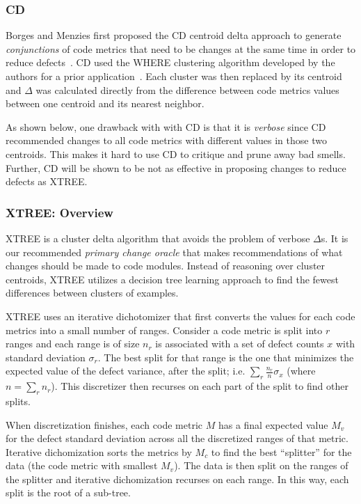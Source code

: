 \documentclass[twocolumn,5p]{elsarticle}
\theoremstyle{break}
\begin{document}
\subsubsection{CD}\label{sec:cdcd}
Borges and Menzies first proposed the CD centroid delta approach to
generate {\em conjunctions} of code metrics
that need to be changes at the same time
in order to reduce defects~\cite{me12c}.
CD used the WHERE clustering algorithm developed by the
authors for a prior application~\cite{localvsglobal}.
Each cluster was then replaced by its centroid
and $\Delta$ was calculated directly from the difference
between code metrics values between one centroid
and its nearest neighbor.


As shown below, one drawback with with CD is that it is {\em verbose}
since
CD   recommended changes to all code
metrics with different values in those two centroids. 
This makes it hard to use CD to   critique and prune away bad smells. Further, CD will be shown to be
not as effective
in proposing changes to reduce defects as XTREE.

\subsubsection{XTREE: Overview}

  XTREE  is a cluster delta algorithm
  that avoids the problem of verbose $\Delta$s.
  It is our recommended {\em primary change oracle} that makes recommendations 
  of what changes should be made to code modules.
  Instead of reasoning over cluster centroids,
  XTREE utilizes a decision tree learning approach
  to find the fewest differences between clusters of examples.
  
  
 XTREE uses an iterative dichotomizer that
first converts the values for each code
metrics into a small number of ranges.
Consider a code metric is split into $r$ ranges and each range is of
  size
    $n_r$ is
  associated with a set of defect counts $x$ with standard deviation
  $\sigma_r$.
  The best split for that range is
  the one that minimizes the expected value of the
  defect variance, after the split; i.e.
  $\sum_r\frac{n_r}{n}\sigma_x$ (where $n=\sum_r n_r$).
  This discretizer then recurses on each part of the split
  to find other splits. 
  
  When discretization finishes, each code metric $M$ has a 
  final expected value $M_v$ for the defect standard deviation 
  across all the discretized ranges of that metric.
  Iterative dichomization sorts the metrics by $M_c$
  to find the best ``splitter'' for the data
  (the code metric with smallest $M_v$). The data
  is then split on the ranges of the splitter and
  iterative dichomization recurses on each range.  In this way,
  each split is the root of a sub-tree.
  
\end{document}
